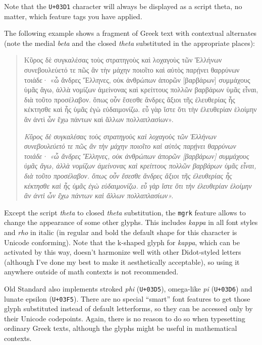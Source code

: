 \documentclass[12pt,a4paper,openany]{book}
\begin{document}
Note that the \texttt{U+03D1} character will always be displayed as a script theta,
no matter, which feature tags you have applied.

The following example shows a fragment of Greek text with contextual
alternates (note the medial \textit{beta} and the closed \textit{theta}
substituted in the appropriate places):

\begin{quote}
\large

Κῦρος δὲ συγκαλέσας τοὺς στρατηγοὺς καὶ λοχαγοὺς τῶν Ἑλλήνων συνεβουλεύετό
τε πῶς ἂν τὴν μάχην ποιοῖτο καὶ αὐτὸς παρῄνει θαρ\-ρύνων τοιάδε· «ὦ ἄνδρες
Ἕλληνες, οὐκ ἀνθρώπων ἀπορῶν [βαρβά\-ρων] συμ\-μάχους ὑμᾶς ἄγω, ἀλλὰ νομίζων
ἀμείνονας καὶ κρείττους πολλῶν βαρβάρων ὑμᾶς εἶναι, διὰ τοῦτο προσέλαβον.
ὅπως οὖν ἔσεσθε ἄνδρες ἄξιοι τῆς ἐλευθερίας ἧς κέκτησθε καὶ ἧς ὑμᾶς ἐγὼ
εὐδαιμονίζω. εὖ γὰρ ἴστε ὅτι τὴν ἐλευθερίαν ἑλοίμην ἂν ἀντὶ ὧν ἔχω πάντων
καὶ ἄλλων πολλαπλασίων».

\itshape
Κῦρος δὲ συγκαλέσας τοὺς στρατηγοὺς καὶ λοχαγοὺς τῶν Ἑλλήνων συνεβουλεύετό
τε πῶς ἂν τὴν μάχην ποιοῖτο καὶ αὐτὸς παρῄνει θαρ\-ρύνων τοιάδε· «ὦ ἄνδρες
Ἕλληνες, οὐκ ἀνθρώπων ἀπορῶν [βαρβά\-ρων] συμ\-μάχους ὑμᾶς ἄγω, ἀλλὰ νομίζων
ἀμείνονας καὶ κρείττους πολλῶν βαρβάρων ὑμᾶς εἶναι, διὰ τοῦτο προσέλαβον.
ὅπως οὖν ἔσεσθε ἄνδρες ἄξιοι τῆς ἐλευθερίας ἧς κέκτησθε καὶ ἧς ὑμᾶς ἐγὼ
εὐδαιμονίζω. εὖ γὰρ ἴστε ὅτι τὴν ἐλευθερίαν ἑλοίμην ἂν ἀντὶ ὧν ἔχω πάντων
καὶ ἄλλων πολλαπλασίων».

\end{quote}

Except the script \textit{theta} to closed \textit{theta} substitution, the
\texttt{mgrk} feature allows to change the appearance of some other glyphs.
This includes \textit{kappa} in all font styles and \textit{rho} in italic
(in regular and bold the default shape for this character is Unicode conforming).
Note that the k-shaped glyph for \textit{kappa}, which can be activated by this way, 
doesn't harmonize well with other Didot-styled letters (although I've done my
best to make it aesthetically acceptable), so using it anywhere outside of
math contexts is not recommended.

Old Standard also implements stroked \textit{phi} (\texttt{U+03D5}), omega-like
\textit{pi} (\texttt{U+03D6}) and lunate epsilon (\texttt{U+03F5}). There are
no special “smart” font features to get those glyph substituted instead of
default letterforms, so they can be accessed only by their Unicode codepoints.
Again, there is no reason to do so when typesetting ordinary Greek texts,
although the glyphs might be useful in mathematical contexts.
\end{document}
